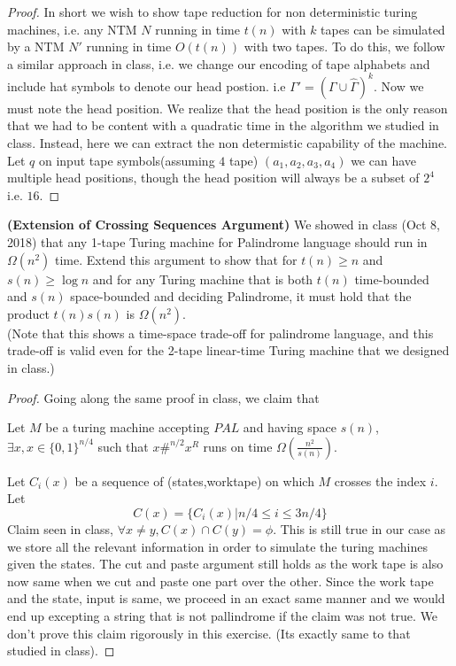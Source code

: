 \documentclass[solution,addpoints,12pt]{exam}
\begin{document}
\begin{questions}
\begin{solution}
	\begin{proof}
		In short we wish to show tape reduction for non deterministic turing machines, i.e. any NTM $N$ running in time $t(n)$ with $k$ tapes can be simulated by a NTM $N'$ running in time $O(t(n))$ with two tapes. To do this, we follow a similar approach in class, i.e. we change our encoding of tape alphabets and include hat symbols to denote our head postion. i.e $\Gamma' = (\Gamma \cup \hat \Gamma)^k$. Now we must note the head position. We realize that the head position is the only reason that we had to be content with a quadratic time in the algorithm we studied in class. Instead, here we can extract the non determistic capability of the machine. Let $q$ on input tape symbols(assuming $4$ tape) $(a_1,a_2,a_3,a_4)$ we can have multiple head positions, though the head position will always be a subset of $2^4$ i.e. $16$.
	\end{proof}
\end{solution}
\question[5]\textbf{(Extension of Crossing Sequences Argument)}
We showed in class (Oct 8, 2018) that any 1-tape Turing machine for {\sc Palindrome} language should run in $\Omega(n^2)$ time. Extend this argument to show that for  $t(n)\ge n$ and $s(n) \ge \log n$ and for any Turing machine that is both $t(n)$ time-bounded and $s(n)$ space-bounded and deciding {\sc Palindrome}, it must hold that the product $t(n)s(n)$ is $\Omega(n^2)$. \\ 
(Note that this shows a time-space trade-off for palindrome language, and this trade-off is valid even for the 2-tape linear-time Turing machine that we designed in class.)
\begin{solution}
	\begin{proof}
		Going along the same proof in class, we claim that 
		
		Let $M$ be a turing machine accepting $PAL$ and having space $s(n)$, $\exists x, x \in \{0,1\}^{n/4}$ such that $x\#^{n/2}x^R$ runs on time $\Omega(\frac{n^2}{s(n)})$. 
		
		Let $C_i(x)$ be a sequence of (states,worktape) on which $M$ crosses the index $i$. Let 
		\[C(x) = \{C_i(x) | n/4 \leq i \leq 3n/4 \}\]
		Claim seen in class, $\forall x \neq y, C(x) \cap C(y) = \phi$. This is still true in our case as we store all the relevant information in order to simulate the turing machines given the states. The cut and paste argument still holds as the work tape is also now same when we cut and paste one part over the other. Since the work tape and the state, input is same, we proceed in an exact same manner and we would end up excepting a string that is not pallindrome if the claim was not true. We don't prove this claim rigorously in this exercise. (Its exactly same to that studied in class).
		

\end{proof}
\end{solution}
\end{questions}
\end{document}
